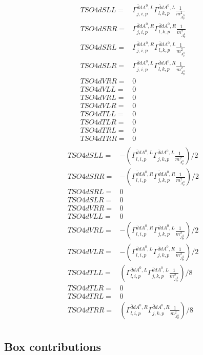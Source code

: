 \documentclass[A4,landscape]{article}
\begin{document}
\begin{align} 
  TSO4dSLL= & \Gamma^{\bar{d}d A^0 ,L}_{j, i, p} \Gamma^{\bar{d}d A^0 ,L}_{l, k, p} \frac{1}{m^2_{A^0_{{p}}}} \\ 
  TSO4dSRR= & \Gamma^{\bar{d}d A^0 ,R}_{j, i, p} \Gamma^{\bar{d}d A^0 ,R}_{l, k, p} \frac{1}{m^2_{A^0_{{p}}}} \\ 
  TSO4dSRL= & \Gamma^{\bar{d}d A^0 ,R}_{j, i, p} \Gamma^{\bar{d}d A^0 ,L}_{l, k, p} \frac{1}{m^2_{A^0_{{p}}}} \\ 
  TSO4dSLR= & \Gamma^{\bar{d}d A^0 ,L}_{j, i, p} \Gamma^{\bar{d}d A^0 ,R}_{l, k, p} \frac{1}{m^2_{A^0_{{p}}}} \\ 
  TSO4dVRR= & 0 \\ 
  TSO4dVLL= & 0 \\ 
  TSO4dVRL= & 0 \\ 
  TSO4dVLR= & 0 \\ 
  TSO4dTLL= & 0 \\ 
  TSO4dTLR= & 0 \\ 
  TSO4dTRL= & 0 \\ 
  TSO4dTRR= & 0 \\ 
\end{align} 
\begin{align} 
  TSO4dSLL= & -(\Gamma^{\bar{d}d A^0 ,L}_{l, i, p} \Gamma^{\bar{d}d A^0 ,L}_{j, k, p} \frac{1}{m^2_{A^0_{{p}}}})/2 \\ 
  TSO4dSRR= & -(\Gamma^{\bar{d}d A^0 ,R}_{l, i, p} \Gamma^{\bar{d}d A^0 ,R}_{j, k, p} \frac{1}{m^2_{A^0_{{p}}}})/2 \\ 
  TSO4dSRL= & 0 \\ 
  TSO4dSLR= & 0 \\ 
  TSO4dVRR= & 0 \\ 
  TSO4dVLL= & 0 \\ 
  TSO4dVRL= & -(\Gamma^{\bar{d}d A^0 ,R}_{l, i, p} \Gamma^{\bar{d}d A^0 ,L}_{j, k, p} \frac{1}{m^2_{A^0_{{p}}}})/2 \\ 
  TSO4dVLR= & -(\Gamma^{\bar{d}d A^0 ,L}_{l, i, p} \Gamma^{\bar{d}d A^0 ,R}_{j, k, p} \frac{1}{m^2_{A^0_{{p}}}})/2 \\ 
  TSO4dTLL= & (\Gamma^{\bar{d}d A^0 ,L}_{l, i, p} \Gamma^{\bar{d}d A^0 ,L}_{j, k, p} \frac{1}{m^2_{A^0_{{p}}}})/8 \\ 
  TSO4dTLR= & 0 \\ 
  TSO4dTRL= & 0 \\ 
  TSO4dTRR= & (\Gamma^{\bar{d}d A^0 ,R}_{l, i, p} \Gamma^{\bar{d}d A^0 ,R}_{j, k, p} \frac{1}{m^2_{A^0_{{p}}}})/8 \\ 
\end{align} 
\subsection{Box contributions} 
\end{document}
